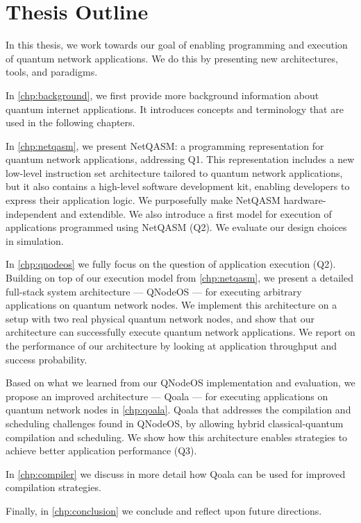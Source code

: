 \section{Thesis Outline}
In this thesis, we work towards our goal of enabling programming and execution of quantum network applications.
We do this by presenting new architectures, tools, and paradigms.

In \cref{chp:background}, we first provide more background information about quantum internet applications.
It introduces concepts and terminology that are used in the following chapters.

In \cref{chp:netqasm}, we present NetQASM: a programming representation for quantum network applications, addressing Q1.
This representation includes a new low-level instruction set architecture tailored to quantum network applications,
but it also contains a high-level software development kit, enabling developers to express their application logic.
We purposefully make NetQASM hardware-independent and extendible.
We also introduce a first model for execution of applications programmed using NetQASM (Q2).
We evaluate our design choices in simulation.

In \cref{chp:qnodeos} we fully focus on the question of application execution (Q2).
Building on top of our execution model from \cref{chp:netqasm}, we present a detailed full-stack system architecture --- QNodeOS --- for executing arbitrary applications on quantum network nodes.
We implement this architecture on a setup with two real physical quantum network nodes, and show that our architecture can successfully execute quantum network applications.
We report on the performance of our architecture by looking at application throughput and success probability.


Based on what we learned from our QNodeOS implementation and evaluation, we propose an improved architecture --- Qoala --- for executing applications on quantum network nodes in \cref{chp:qoala}.
Qoala that addresses the compilation and scheduling challenges found in QNodeOS, by allowing hybrid classical-quantum compilation and scheduling.
We show how this architecture enables strategies to achieve better application performance (Q3).

In \cref{chp:compiler} we discuss in more detail how Qoala can be used for improved compilation strategies.

Finally, in \cref{chp:conclusion} we conclude and reflect upon future directions.




